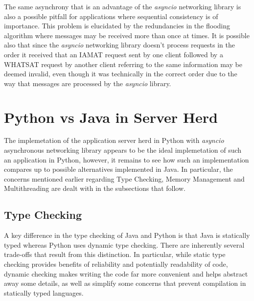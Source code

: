 \noindent The same asynchrony that is an advantage of the \emph{asyncio} networking library is also a possible pitfall for applications where sequential consistency is of importance. This problem is elucidated by the redundancies in the flooding algorithm where messages may be received more than once at times. It is possible also that since the \emph{asyncio} networking library doesn't process requests in the order it received that an IAMAT request sent by one client followed by a WHATSAT request by another client referring to the same information may be deemed invalid, even though it was technically in the correct order due to the way that messages are processed by the \emph{asyncio} library. 

\section{Python vs Java in Server Herd}
The implemetation of the application server herd in Python with \emph{asyncio} asynchronous networking library appears to be the ideal implemetation of such an application in Python, however, it remains to see how such an implementation compares up to possible alternatives implemented in Java. In particular, the concerns mentioned earlier regarding Type Checking, Memory Management and Multithreading are dealt with in the subsections that follow. 

\subsection{Type Checking}

A key difference in the type checking of Java and Python is that Java is statically typed whereas Python uses dynamic type checking. There are inherently several trade-offs that result from this distinction. In particular, while static type checking provides benefits of reliability and potentially readability of code, dynamic checking makes writing the code far more convenient and helps abstract away some details, as well as simplify some concerns that prevent compilation in statically typed languages.\newline

